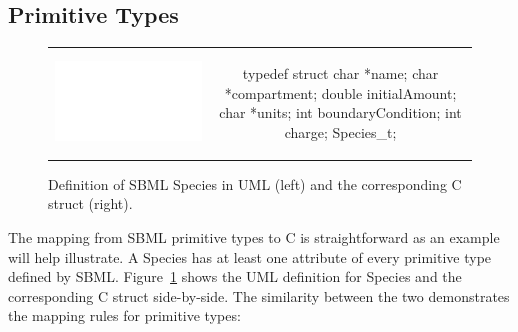 \documentclass{cekmanual}
\begin{document}
\subsection{Primitive Types}


\begin{figure}[t]
  \begin{tabular}{m{8.5cm}c}
    \includegraphics[scale=0.68]{species}
    &
    \begin{example}[c]
typedef struct
{
  char    *name;
  char    *compartment;
  double  initialAmount;
  char    *units;
  int     boundaryCondition;
  int     charge;
} Species_t;
    \end{example}\\
  \end{tabular}
  \caption{Definition of SBML Species in UML (left) and the
  corresponding  C struct (right).}
  \label{fig:species-uml-and-c}
\end{figure}

The mapping from SBML primitive types to C is straightforward as an
example will help illustrate.  A Species has at least one attribute of
every primitive type defined by SBML.
Figure~\ref{fig:species-uml-and-c} shows the UML definition for
Species and the corresponding C struct side-by-side.  The similarity
between the two demonstrates the mapping rules for primitive types:
\end{document}
